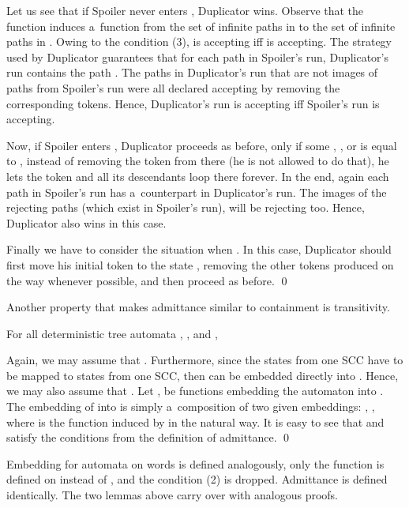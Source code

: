 \documentclass{LMCS}
\begin{document}
Let us see that if Spoiler never enters , Duplicator wins. Observe that the function  induces a~function  from the set of infinite paths in  to the set of infinite paths in . Owing to the condition (3),  is accepting iff  is accepting. The strategy used by Duplicator guarantees that for each path  in Spoiler's run, Duplicator's run contains the path . The paths in Duplicator's run that are not images of paths from Spoiler's run were all declared accepting by removing the corresponding tokens. Hence, Duplicator's run is accepting iff Spoiler's run is accepting. 

Now, if Spoiler enters , Duplicator proceeds as before, only if some , , or  is equal to , instead of removing the token from there (he is not allowed to do that), he lets the token and all its descendants loop there forever.  In the end, again each path in Spoiler's run has a~counterpart in Duplicator's run. The images of the rejecting paths (which exist in Spoiler's run), will be rejecting too. Hence, Duplicator also wins in this case. 

Finally we have to consider the situation when . In this case, Duplicator should first move his initial token to the state ,  removing the other tokens produced on the way whenever possible, and then proceed as before.  \qed

\vspace{5pt}

Another property that makes admittance similar to containment is transitivity. 

\begin{lem} \label{transitivity}
For all deterministic tree automata , , and ,
 
\end{lem}

\proof Again, we may assume that . Furthermore, since the states from one SCC have to be mapped to states from one SCC, then  can be embedded directly into . Hence, we may also assume that . Let ,  be functions embedding the automaton  into  . The embedding of  into  is simply a~composition of two given embeddings: , , where  is the function induced by  in the natural way. It is easy to see that  and  satisfy the conditions from the definition of admittance. \qed

\vspace{5pt}

Embedding for automata on words is defined analogously, only the function  is defined on  instead of , and the condition (2) is dropped. Admittance is defined identically. The two lemmas above carry over with analogous proofs. 
\end{document}

